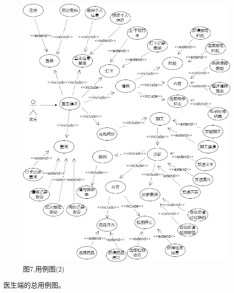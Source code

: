 \documentclass[24pt,a4paper]{article}%
\begin{document}
\begin{figure}[H]
    \centering
    \includegraphics[width=1\textwidth]{image/example2.png}
    \caption*{图7.用例图(2)}
\end{figure}
医生端的总用例图。
\end{document}
